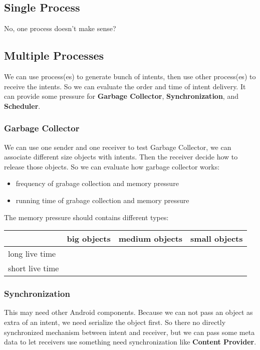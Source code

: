 \documentclass[11pt]{article}
\begin{document}
\subsection{Single Process}
\label{sec-3-1}
No, one process doesn't make sense?

\subsection{Multiple Processes}
\label{sec-3-2}
We can use process(es) to generate bunch of intents, then use other
process(es) to receive the intents.
So we can evaluate the order and time of intent delivery.
It can provide some pressure for \textbf{Garbage Collector}, \textbf{Synchronization}, and \textbf{Scheduler}.

\subsubsection{Garbage Collector}
\label{sec-3-2-1}
We can use one sender and one receiver to test Garbage Collector,
we can associate different size objects with intents.
Then the receiver decide how to release those objects.
So we can evaluate how garbage collector works:
\begin{itemize}
\item frequency of grabage collection and memory pressure
\item running time of grabage collection and memory pressure
\end{itemize}

The memory pressure should contains different types:
\begin{center}
\begin{tabular}{l|lll}
 & big objects & medium objects & small objects\\
\hline
long live time &  &  & \\
short live time &  &  & \\
\end{tabular}
\end{center}

\subsubsection{Synchronization}
\label{sec-3-2-2}
This may need other Android components.
Because we can not pass an object as extra of an intent, we need serialize the object first.
So there no directly synchronized mechanism between intent and receiver,
but we can pass some meta data to let receivers use something need synchronization like \textbf{Content Provider}.
\end{document}
